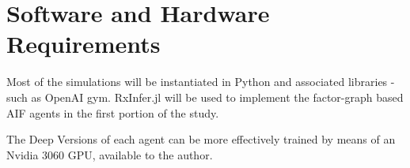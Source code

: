 \documentclass[12pt, twoside]{report}
\begin{document}
\section{Software and Hardware Requirements}
Most of the simulations will be instantiated in Python and associated libraries  - such as OpenAI gym.
RxInfer.jl will be used to implement the factor-graph based AIF agents in the first portion of the study.

The Deep Versions of each agent can be more effectively trained by means of an Nvidia 3060 GPU, available to the author.  


\printbibliography
\end{document}
